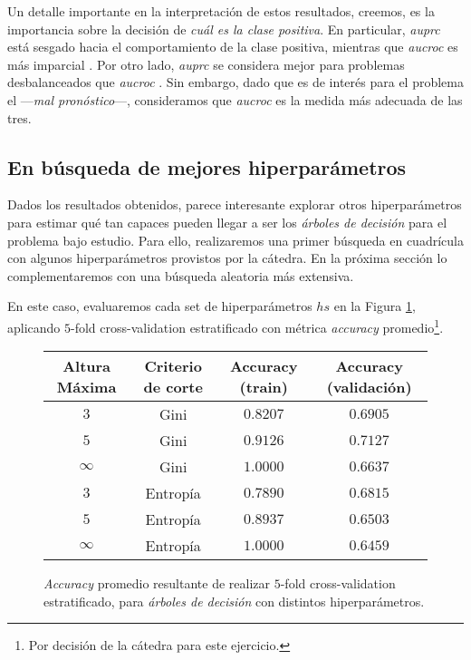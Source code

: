 Un detalle importante en la interpretación de estos resultados, creemos, es la importancia sobre la decisión de \textit{cuál es la clase positiva}. En particular, \textit{auprc} está sesgado hacia el comportamiento de la clase positiva, mientras que \textit{aucroc} es más imparcial \cite{Saito}. Por otro lado, \textit{auprc} se considera mejor para problemas desbalanceados que \textit{aucroc} \cite{Saito}. Sin embargo, dado que es de interés para el problema el ---\textit{mal pronóstico}---, consideramos que \textit{aucroc} es la medida más adecuada de las tres.

\subsection{En búsqueda de mejores hiperparámetros}

Dados los resultados obtenidos, parece interesante explorar otros hiperparámetros para estimar qué tan capaces pueden llegar a ser los \textit{árboles de decisión} para el problema bajo estudio. Para ello, realizaremos una primer búsqueda en cuadrícula con algunos hiperparámetros provistos por la cátedra. En la próxima sección lo complementaremos con una búsqueda aleatoria más extensiva.

En este caso, evaluaremos cada set de hiperparámetros $hs$ en la Figura \ref{grid_search}, aplicando $5$-fold cross-validation estratificado con métrica \textit{accuracy} promedio\footnote{Por decisión de la cátedra para este ejercicio.}.

\vspace{0.5em}
\begin{figure}[!htbp]
    \begin{center}
        \begin{tabular}{ |c|c|c|c| } 
         \hline
        Altura Máxima   & Criterio de corte & Accuracy (train)  & Accuracy (validación) \\
        \hline
        $3$             & Gini              &  $0.8207$         & $0.6905$  \\ 
        $5$             & Gini              &  $0.9126$         & $0.7127$  \\
        $\infty$        & Gini              &  $1.0000$         & $0.6637$  \\ 
        $3$             & Entropía          &  $0.7890$         & $0.6815$  \\
        $5$             & Entropía          &  $0.8937$         & $0.6503$  \\ 
        $\infty$        & Entropía          &  $1.0000$         & $0.6459$  \\ 
        \hline
        \end{tabular}
    \end{center}
    \caption{\textit{Accuracy} promedio resultante de realizar $5$-fold cross-validation estratificado, para \textit{árboles de decisión} con distintos hiperparámetros.} \label{grid_search}
\end{figure}

